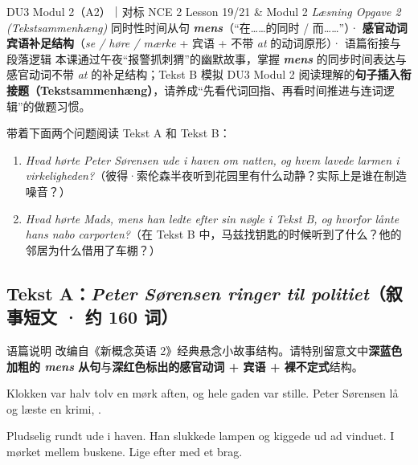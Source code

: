 {DU3 Modul 2（A2）｜对标 NCE 2 Lesson 19/21 \& Modul 2 \textit{Læsning Opgave 2 (Tekstsammenhæng)}}
{同时性时间从句 \textbf{\textit{mens}}（“在……的同时 / 而……”）· \textbf{感官动词宾语补足结构}（\textit{se / høre / mærke} + 宾语 + 不带 \textit{at} 的动词原形）· 语篇衔接与段落逻辑}
{本课通过午夜“报警抓刺猬”的幽默故事，掌握 \textbf{\textit{mens}} 的同步时间表达与感官动词不带 \textit{at} 的补足结构；Tekst B 模拟 DU3 Modul 2 阅读理解的\textbf{句子插入衔接题（Tekstsammenhæng）}，请养成“先看代词回指、再看时间推进与连词逻辑”的做题习惯。}

\begin{foerduleaeser}
带着下面两个问题阅读 Tekst A 和 Tekst B：
\begin{enumerate}
  \item \textit{Hvad hørte Peter Sørensen ude i haven om natten, og hvem lavede larmen i virkeligheden?}（彼得·索伦森半夜听到花园里有什么动静？实际上是谁在制造噪音？）
  \item \textit{Hvad hørte Mads, mens han ledte efter sin nøgle i Tekst B, og hvorfor lånte hans nabo carporten?}（在 Tekst B 中，马兹找钥匙的时候听到了什么？他的邻居为什么借用了车棚？）
\end{enumerate}
\end{foerduleaeser}


\subsection*{Tekst A：\textit{Peter Sørensen ringer til politiet}（叙事短文 · 约 160 词）}

\begin{tipbox}{语篇说明}
改编自《新概念英语 2》经典悬念小故事结构。请特别留意文中\textbf{\color{NCDNavy}深蓝色加粗的 \textit{mens} 从句}与\textbf{\color{NCDRed}深红色标出的感官动词 + 宾语 + 裸不定式}结构。
\end{tipbox}

Klokken var halv tolv en mørk aften, og hele gaden var stille. Peter Sørensen lå og læste en krimi, .

Pludselig  rundt ude i haven. Han slukkede lampen og kiggede ud ad vinduet. I mørket  mellem buskene. Lige efter  med et brag.

